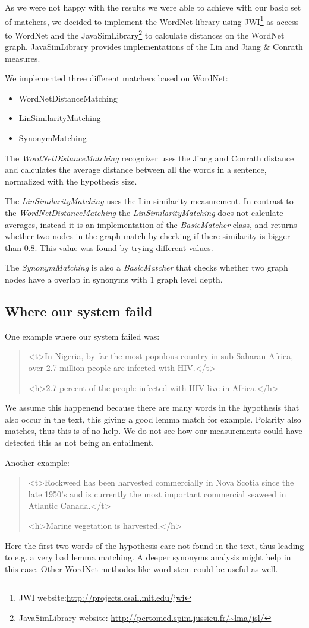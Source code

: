 As we were not happy with the results we were able to achieve with our basic set of matchers, we decided to implement
the WordNet library using JWI\footnote{JWI website:\url{http://projects.csail.mit.edu/jwi}} as access to WordNet and the
JavaSimLibrary\footnote{JavaSimLibrary website: \url{http://pertomed.spim.jussieu.fr/~lma/jsl/}} to calculate distances
on the WordNet graph. JavaSimLibrary provides implementations of the Lin and Jiang \& Conrath measures.

We implemented three different matchers based on WordNet:
\begin{itemize}
    \item WordNetDistanceMatching
    \item LinSimilarityMatching
    \item SynonymMatching
\end{itemize} 

The \textit{WordNetDistanceMatching} recognizer uses the Jiang and Conrath distance and calculates the average distance
between all the words in a sentence, normalized with the hypothesis size.

The \textit{LinSimilarityMatching} uses the Lin similarity measurement. In contrast to the
\textit{WordNetDistanceMatching} the \textit{LinSimilarityMatching} does not calculate averages, instead it is an
implementation of the \textit{BasicMatcher} class, and returns whether two nodes in the graph match by checking if there
similarity is bigger than 0.8. This value was found by trying different values.

The \textit{SynonymMatching} is also a \textit{BasicMatcher} that checks whether two graph nodes have a overlap in synonyms
with 1 graph level depth.

\subsection{Where our system faild}
One example where our system failed was:
\begin{quote}
<t>In Nigeria, by far the most populous country in sub-Saharan Africa, over 2.7 million people are infected with HIV.</t>

<h>2.7 percent of the people infected with HIV live in Africa.</h>
\end{quote}
We assume this happenend because there are many words in the hypothesis that also occur in the text, this giving a good
lemma match for example. Polarity also matches, thus this is of no help. We do not see how our measurements could have
detected this as not being an entailment.


Another example:
\begin{quote}
<t>Rockweed has been harvested commercially in Nova Scotia since the late 1950's and is currently the most important commercial seaweed in Atlantic Canada.</t>

<h>Marine vegetation is  harvested.</h>
\end{quote}
Here the first two words of the hypothesis care not found in the text, thus leading to e.g. a very bad lemma matching. A
deeper synonyms analysis might help in this case. Other WordNet methodes like word stem could be useful as well.



